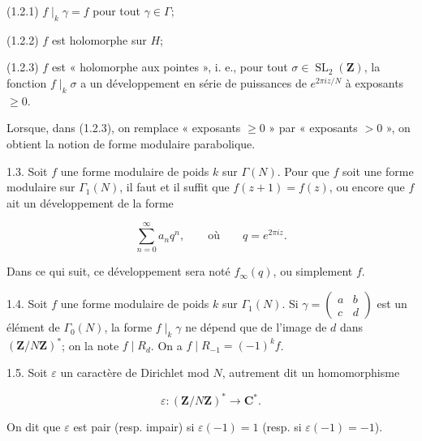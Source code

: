 \documentclass[10pt,oneside]{article}
\begin{document}
(1.2.1) \(f\mid_k\gamma=f\) pour tout \(\gamma\in\Gamma\);\par

(1.2.2) \(f\) est holomorphe sur \(H\);\par

(1.2.3) \(f\) est « holomorphe aux pointes », i. e., pour tout \(\sigma\in\operatorname{SL}_2(\mathbf{Z})\), la fonction \(f\mid_k\sigma\) a un développement en série de puissances de \(e^{2\pi iz/N}\) à exposants \(\geq 0\).\par

Lorsque, dans (1.2.3), on remplace « exposants \(\geq 0\) » par « exposants \(>0\) », on obtient la notion de forme modulaire parabolique.\par

1.3. Soit \(f\) une forme modulaire de poids \(k\) sur \(\Gamma(N)\). Pour que \(f\) soit une forme modulaire sur \(\Gamma_1(N)\), il faut et il suffit que \(f(z+1)=f(z)\), ou encore que \(f\) ait un développement de la forme\par

\begin{equation*}
\sum_{n=0}^{\infty}a_nq^n,
\qquad\text{où}\qquad q=e^{2\pi iz}.
\end{equation*}

Dans ce qui suit, ce développement sera noté \(f_\infty(q)\), ou simplement \(f\).\par

1.4. Soit \(f\) une forme modulaire de poids \(k\) sur \(\Gamma_1(N)\). Si \(\gamma=\begin{pmatrix}a&b\\c&d\end{pmatrix}\) est un élément de \(\Gamma_0(N)\), la forme \(f\mid_k\gamma\) ne dépend que de l'image de \(d\) dans \((\mathbf{Z}/N\mathbf{Z})^*\); on la note \(f\mid R_d\). On a \(f\mid R_{-1}=(-1)^kf\).\par

1.5. Soit \(\varepsilon\) un caractère de Dirichlet mod \(N\), autrement dit un homomorphisme\par

\begin{equation*}
\varepsilon:(\mathbf{Z}/N\mathbf{Z})^*\longrightarrow\mathbf{C}^*.
\end{equation*}

On dit que \(\varepsilon\) est pair (resp. impair) si \(\varepsilon(-1)=1\) (resp. si \(\varepsilon(-1)=-1\)).\par
\end{document}
